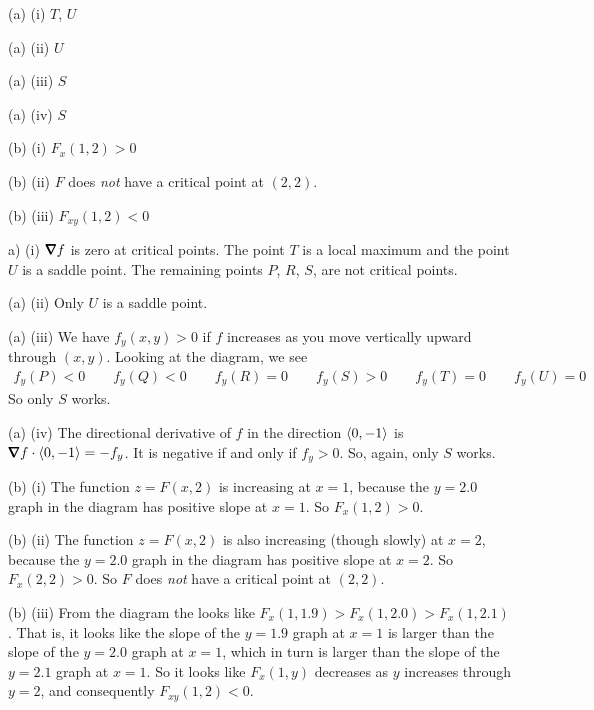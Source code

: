 %

\begin{answer}
(a) (i) $T$, $U$

(a) (ii) $U$

(a) (iii) $S$

(a) (iv) $S$

(b) (i) $F_x(1,2)>0$

(b) (ii) $F$ does \emph{not} have a critical point at $(2,2)$.

(b) (iii) $F_{xy}(1,2)<0$
\end{answer}

\begin{solution}
a) (i) $\vnabla f$ is zero at critical points. 
        The point $T$ is a local maximum and the point $U$ is
        a saddle point. The remaining points $P$, $R$, $S$, are not
        critical points.

(a) (ii) Only $U$ is a saddle point. 

(a) (iii) We have $f_y(x,y)>0$ if $f$ increases as you move vertically upward
          through $(x,y)$. Looking at the diagram, we see
\begin{align*}
f_y(P) <0\qquad
f_y(Q) <0\qquad
f_y(R) =0\qquad
f_y(S) >0\qquad
f_y(T) =0\qquad
f_y(U) =0
\end{align*}
So only $S$ works.

(a) (iv) The directional derivative of $f$ in the direction $\left< 0,-1\right>$
           is $\vnabla f\cdot \llt 0,-1\rgt =-f_y$. It is negative if and
           only if $f_y>0$. So, again, only $S$ works.

(b) (i) The function $z=F(x,2)$ is increasing at $x=1$,
     because the $y=2.0$ graph in the diagram has positive slope at $x=1$.
     So $F_x(1,2)>0$.

(b) (ii) The function $z=F(x,2)$ is also increasing (though slowly) at $x=2$,
     because the $y=2.0$ graph in the diagram has positive slope at $x=2$.
     So $F_x(2,2)>0$. So $F$ does \emph{not} have a critical point
     at $(2,2)$.


(b) (iii) From the diagram the looks like 
                $F_x(1,1.9) > F_x(1,2.0) > F_x(1,2.1)$.
      That is, it looks like the slope of the $y=1.9$ graph at $x=1$
             is larger than the slope of the $y=2.0$ graph at $x=1$,
             which in turn 
             is larger than the slope of the $y=2.1$ graph at $x=1$.
     So it looks like $F_x(1,y)$ decreases as $y$ increases through $y=2$,
     and consequently $F_{xy}(1,2)<0$.
\end{solution}


